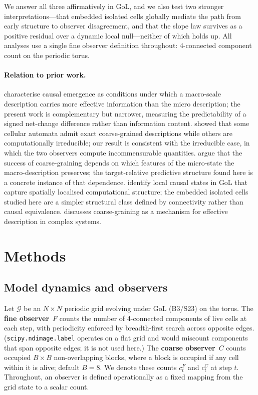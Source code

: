\documentclass[11pt,a4paper]{article}
\begin{document}
We answer all three affirmatively in GoL, and we also test two stronger
interpretations---that embedded isolated cells globally mediate the path from
early structure to observer disagreement, and that the slope law survives as a
positive residual over a dynamic local null---neither of which holds up.
All analyses use a single fine observer definition throughout: 4-connected
component count on the periodic torus.

\paragraph{Relation to prior work.}
\citet{hoel2013} characterise causal emergence as conditions under which a
macro-scale description carries more effective information than the micro
description; the present work is complementary but narrower, measuring the
predictability of a signed net-change difference rather than information
content.
\citet{israeli2004} showed that some cellular automata admit exact
coarse-grained descriptions while others are computationally irreducible;
our result is consistent with the irreducible case, in which the two
observers compute incommensurable quantities.
\citet{shalizi2003} argue that the success of coarse-graining depends on
which features of the micro-state the macro-description preserves; the
target-relative predictive structure found here is a concrete instance of
that dependence.
\citet{rupe2018} identify local causal states in GoL that capture spatially
localised computational structure; the embedded isolated cells studied here
are a simpler structural class defined by connectivity rather than causal
equivalence.
\citet{flack2017} discusses coarse-graining as a mechanism for effective
description in complex systems.

\section{Methods}
\label{sec:defs}

\subsection{Model dynamics and observers}

Let $\mathcal{G}$ be an $N\times N$ periodic grid evolving under GoL
(B3/S23) on the torus.
The \textbf{fine observer}~$F$ counts the number of 4-connected components
of live cells at each step, with periodicity enforced by breadth-first search
across opposite edges.
(\texttt{scipy.ndimage.label} operates on a flat grid and would miscount
components that span opposite edges; it is not used here.)
The \textbf{coarse observer}~$C$ counts occupied $B\times B$
non-overlapping blocks, where a block is occupied if any cell within it is
alive; default $B=8$.
We denote these counts $c^F_t$ and $c^C_t$ at step $t$.
Throughout, an observer is defined operationally as a fixed mapping from the
grid state to a scalar count.
\end{document}

